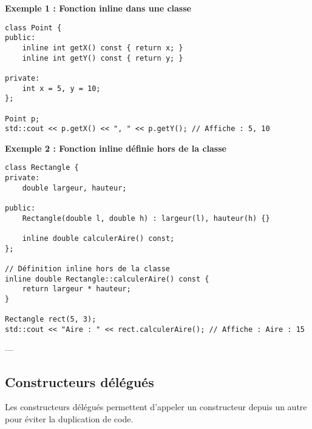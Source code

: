 \textbf{Exemple 1 : Fonction inline dans une classe}
\begin{tcolorbox}[colframe=blue!50!black, colback=blue!5!white, title=Exemple d'Attributs et Méthodes Statistiques, float=htb]
\begin{verbatim}
class Point {
public:
    inline int getX() const { return x; }
    inline int getY() const { return y; }

private:
    int x = 5, y = 10;
};

Point p;
std::cout << p.getX() << ", " << p.getY(); // Affiche : 5, 10
\end{verbatim}
\end{tcolorbox}
\textbf{Exemple 2 : Fonction inline définie hors de la classe}
\begin{tcolorbox}[colframe=blue!50!black, colback=blue!5!white, title=Exemple d'Attributs et Méthodes Statistiques, float=htb]
\begin{verbatim}
class Rectangle {
private:
    double largeur, hauteur;

public:
    Rectangle(double l, double h) : largeur(l), hauteur(h) {}

    inline double calculerAire() const;
};

// Définition inline hors de la classe
inline double Rectangle::calculerAire() const {
    return largeur * hauteur;
}

Rectangle rect(5, 3);
std::cout << "Aire : " << rect.calculerAire(); // Affiche : Aire : 15
\end{verbatim}
\end{tcolorbox}
---

\subsection{ Constructeurs délégués}
Les constructeurs délégués permettent d’appeler un constructeur depuis un autre pour éviter la duplication de code.

